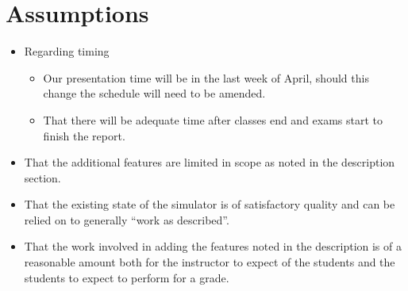 \documentclass{article}
\begin{document}
\section{Assumptions}

\begin{itemize}
\item Regarding timing
  \begin{itemize}
  \item Our presentation time will be in the last week of April,
    should this change the schedule will need to be amended.
  \item That there will be adequate time after classes end and exams
    start to finish the report.
  \end{itemize}
\item That the additional features are limited in scope as noted in
  the description section.

\item That the existing state of the simulator is of satisfactory
  quality and can be relied on to generally “work as described”.

\item That the work involved in adding the features noted in the
  description is of a reasonable amount both for the instructor to
  expect of the students and the students to expect to perform for a
  grade.
\end{itemize}

\newpage



\end{document}
